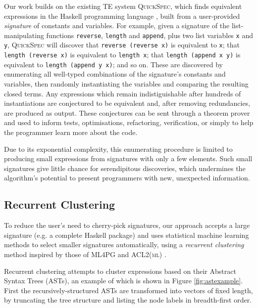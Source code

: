 \documentclass[]{sig-alternate}
\begin{document}
Our work builds on the existing TE system
\textsc{QuickSpec}\cite{QuickSpec}, which finds equivalent expressions
in the Haskell programming language \cite{marlow2010haskell}, built from a user-provided
\emph{signature} of constants and variables. For example, given a
signature of the list-manipulating functions \texttt{reverse},
\texttt{length} and \texttt{append}, plus two list variables \texttt{x}
and \texttt{y}, \textsc{QuickSpec} will discover that
\texttt{reverse\ (reverse\ x)} is equivalent to \texttt{x}; that
\texttt{length\ (reverse\ x)} is equivalent to \texttt{length\ x}; that
\texttt{length\ (append\ x\ y)} is equivalent to
\texttt{length\ (append\ y\ x)}; and so on. These are discovered by
enumerating all well-typed combinations of the signature's constants and
variables, then randomly instantiating the variables \cite{claessen2011quickcheck} and comparing the
resulting closed terms. Any expressions which remain indistiguishable
after hundreds of instantiations are conjectured to be equivalent and,
after removing redundancies, are produced as output. These conjectures
can be sent through a theorem prover \cite{claessen2013automating} and used to inform tests,
optimisations, refactoring, verification, or simply to help the
programmer learn more about the code.

Due to its exponential complexity, this enumerating procedure is limited
to producing small expressions from signatures with only a few elements.
Such small signatures give little chance for serendipitous discoveries,
which undermines the algorithm's potential to present programmers with
new, unexpected information.

\subsection{Recurrent Clustering}\label{recurrent-clustering}

To reduce the user's need to cherry-pick signatures, our approach
accepts a large signature (e.g. a complete Haskell package) and uses
statistical machine learning methods to select smaller signatures
automatically, using a \emph{recurrent clustering} method inspired by
those of \textsc{ML4PG} \cite{journals/corr/abs-1212-3618} and \textsc{ACL2(ml)} \cite{Heras.Komendantskaya.Johansson.ea:2013}.

Recurrent clustering attempts to cluster expressions based on their
Abstract Syntax Trees (ASTs), an example of which is shown in Figure \ref{fig:astexample}. First the recursively-structured ASTs are
transformed into vectors of fixed length, by truncating the tree
structure and listing the node labels in breadth-first order.
\end{document}
